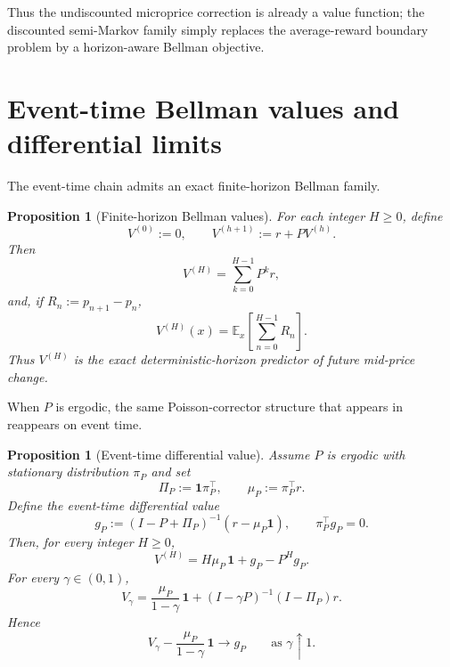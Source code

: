 \documentclass[11pt,twoside]{article}
\theoremstyle{plain}
\newtheorem{proposition}[theorem]{Proposition}
\theoremstyle{definition}
\theoremstyle{remark}
\newcommand{\1}{\mathbf{1}}
\newcommand{\E}{\mathbb{E}}
\newcommand{\PiP}{\Pi_P}
\begin{document}
Thus the undiscounted microprice correction is already a value function; the discounted semi-Markov family simply replaces the average-reward boundary problem by a horizon-aware Bellman objective.

\section{Event-time Bellman values and differential limits}

The event-time chain admits an exact finite-horizon Bellman family.

\begin{proposition}[Finite-horizon Bellman values]\label{prop:finite_horizon}
For each integer $H\ge 0$, define
\[
V^{(0)}:=0,
\qquad
V^{(h+1)}:=r+PV^{(h)}.
\]
Then
\begin{equation}\label{eq:finite_horizon_closed}
V^{(H)}=\sum_{k=0}^{H-1}P^k r,
\end{equation}
and, if $R_n:=p_{n+1}-p_n$,
\begin{equation}\label{eq:finite_horizon_expectation}
V^{(H)}(x)=\E_x\!\left[\sum_{n=0}^{H-1}R_n\right].
\end{equation}
Thus $V^{(H)}$ is the exact deterministic-horizon predictor of future mid-price change.
\end{proposition}

When $P$ is ergodic, the same Poisson-corrector structure that appears in \cite{Petersen2025} reappears on event time.

\begin{proposition}[Event-time differential value]\label{prop:event_time_poisson}
Assume $P$ is ergodic with stationary distribution $\pi_P$ and set
\[
\PiP:=\1\pi_P^\top,
\qquad
\mu_P:=\pi_P^\top r.
\]
Define the event-time differential value
\begin{equation}\label{eq:event_time_diff_value}
g_P:=(I-P+\PiP)^{-1}(r-\mu_P\1),
\qquad
\pi_P^\top g_P=0.
\end{equation}
Then, for every integer $H\ge 0$,
\begin{equation}\label{eq:finite_horizon_decomp}
V^{(H)}=H\mu_P\,\1+g_P-P^H g_P.
\end{equation}
For every $\gamma\in(0,1)$,
\begin{equation}\label{eq:discounted_split_event_time}
V_\gamma
=
\frac{\mu_P}{1-\gamma}\,\1
+
(I-\gamma P)^{-1}(I-\PiP)r.
\end{equation}
Hence
\begin{equation}\label{eq:discounted_boundary_event_time}
V_\gamma-\frac{\mu_P}{1-\gamma}\,\1
\longrightarrow g_P
\qquad\text{as }\gamma\uparrow 1.
\end{equation}
\end{proposition}
\end{document}
